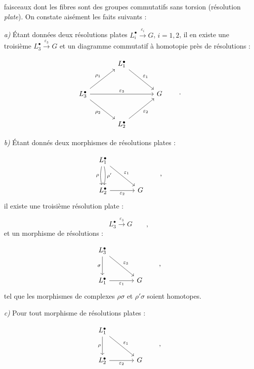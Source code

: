 faisceaux dont les fibres sont des groupes commutatifs sans torsion
(résolution \emph{plate}). On constate aisément les faits suivants :

\noindent\emph{a)} Étant données deux résolutions plates
$L_i^{\bullet}\xrightarrow{\varepsilon_i}G$, $i=1,2$, il en existe une
troisième $L_3^{\bullet}\xrightarrow{\varepsilon_3}G$ et un diagramme
commutatif à homotopie près de résolutions :

\[
\begin{tikzcd}[column sep=large,row sep=large]
  & L_1^{\bullet} \arrow[dr,"\varepsilon_1"] & \\
L_3^{\bullet} \arrow[ur,"\rho_1"] \arrow[rr,"\varepsilon_3"]
  \arrow[dr,"\rho_2"'] && G \\
  & L_2^{\bullet} \arrow[ur,"\varepsilon_2"'] &
\end{tikzcd}
\qquad\text{.}
\]

\noindent\emph{b)} Étant donnés deux morphismes de résolutions plates :

\[
\begin{tikzcd}[column sep=large,row sep=large]
L_1^{\bullet}
  \arrow[d,bend right=12,"\rho"']
  \arrow[d,bend left=12,"\rho'"]
  \arrow[dr,"\varepsilon_1"] & \\
L_2^{\bullet} \arrow[r,"\varepsilon_2"'] & G
\end{tikzcd}
\qquad\text{,}
\]
il existe une troisième résolution plate :

\[
L_3^{\bullet}\xrightarrow{\varepsilon_3}G
\qquad\text{,}
\]
et un morphisme de résolutions :

\[
\begin{tikzcd}[column sep=large,row sep=large]
L_3^{\bullet} \arrow[d,"\sigma"'] \arrow[dr,"\varepsilon_3"] & \\
L_1^{\bullet} \arrow[r,"\varepsilon_1"'] & G
\end{tikzcd}
\qquad\text{,}
\]
tel que les morphismes de complexes $\rho\sigma$ et $\rho'\sigma$ soient
homotopes.

\noindent\emph{c)} Pour tout morphisme de résolutions plates :

\[
\begin{tikzcd}[column sep=large,row sep=large]
L_1^{\bullet} \arrow[d,"\rho"'] \arrow[dr,"\varepsilon_1"] & \\
L_2^{\bullet} \arrow[r,"\varepsilon_2"'] & G
\end{tikzcd}
\qquad\text{,}
\]
